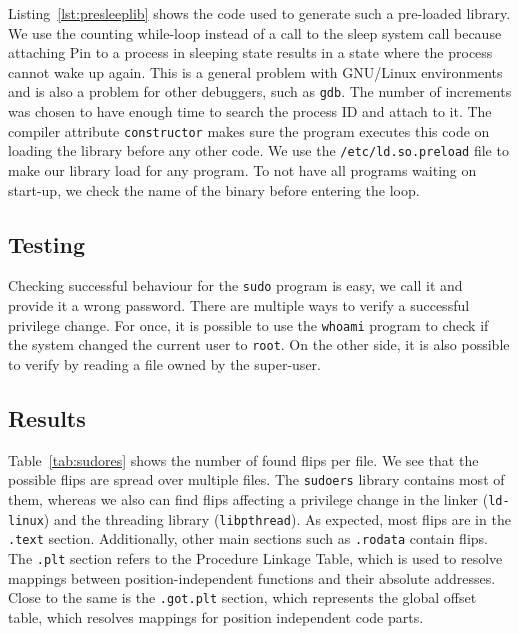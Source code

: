 Listing~\ref{lst:presleeplib} shows the code used to generate such a pre-loaded
library. We use the counting while-loop instead of a call to the sleep system
call because attaching Pin to a process in sleeping state results in a state
where the process cannot wake up again. This is a general problem with
GNU/Linux environments and is also a problem for other debuggers, such as
\texttt{gdb}. The number of increments was chosen to have enough time to
search the process ID and attach to it. The compiler attribute
\texttt{constructor} makes sure the program executes this code on loading the
library before any other code. We use the \texttt{/etc/ld.so.preload} file to
make our library load for any program. To not have all programs waiting on
start-up, we check the name of the binary before entering the loop.

\subsection{Testing}

Checking successful behaviour for the \texttt{sudo} program is easy, we call it
and provide it a wrong password. There are multiple ways to verify a successful
privilege change. For once, it is possible to use the \texttt{whoami} program
to check if the system changed the current user to \texttt{root}. On the other
side, it is also possible to verify by reading a file owned by the super-user.

\subsection{Results}

Table~\ref{tab:sudores} shows the number of found flips per file. We see that
the possible flips are spread over multiple files. The \texttt{sudoers} library
contains most of them, whereas we also can find flips affecting a privilege
change in the linker (\texttt{ld-linux}) and the threading library
(\texttt{libpthread}). As expected, most flips are in the \texttt{.text}
section. Additionally, other main sections such as \texttt{.rodata} contain
flips. The \texttt{.plt} section refers to the Procedure Linkage Table, which is
used to resolve mappings between position-independent functions and their
absolute addresses. Close to the same is the \texttt{.got.plt} section, which
represents the global offset table, which resolves mappings for position
independent code parts.

